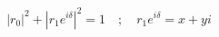\documentclass[preview]{standalone}
\begin{document}
\begin{align*}
|r_0|^2 + |r_1 e^{i\delta}|^2 = 1 \quad ; \quad r_1 e^{i\delta}  = x + yi
\end{align*}
\end{document}
